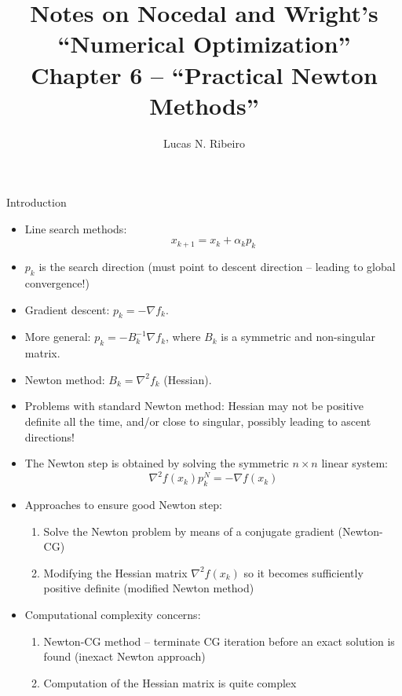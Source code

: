 \documentclass{beamer}
\title[Chapter 6]{Notes on Nocedal and Wright's ``Numerical Optimization''\\Chapter 6 --  ``Practical Newton Methods''}
\author{Lucas N. Ribeiro}
\date{}
\begin{document}
 
\frame{\titlepage}
 
\begin{frame}[allowframebreaks]{Introduction}
	\begin{itemize}
		\item Line search methods:
		\[
			x_{k+1} = x_k + \alpha_k p_k
		\]
		\item $p_k$ is the search direction (must point to descent direction -- leading to global convergence!)
		\item Gradient descent: $p_k = -\nabla f_k$.
		\item More general: $p_k = -B_k^{-1} \nabla f_k$, where $B_k$ is a symmetric and non-singular matrix.
		\item Newton method: $B_k = \nabla^2 f_k$ (Hessian).
		\item Problems with standard Newton method: Hessian may not be positive definite all the time, and/or close to singular, possibly leading to ascent directions!
		\item The Newton step is obtained by solving the symmetric $n\times n$ linear system:
		\[
			\nabla^2 f(x_k) p_k^N = -\nabla f(x_k)
		\]
		\item Approaches to ensure good Newton step:
		\begin{enumerate}
			\item Solve the Newton problem by means of a conjugate gradient (Newton-CG)
			\item Modifying the Hessian matrix $\nabla^2 f(x_k)$ so it becomes sufficiently positive definite (modified Newton method)
		\end{enumerate}
	
		\item Computational complexity concerns:
		\begin{enumerate}
			\item Newton-CG method -- terminate CG iteration before an exact solution is found (inexact Newton approach)
			\item Computation of the Hessian matrix is quite complex
		\end{enumerate}
	\end{itemize}
\end{frame}
\end{document}
